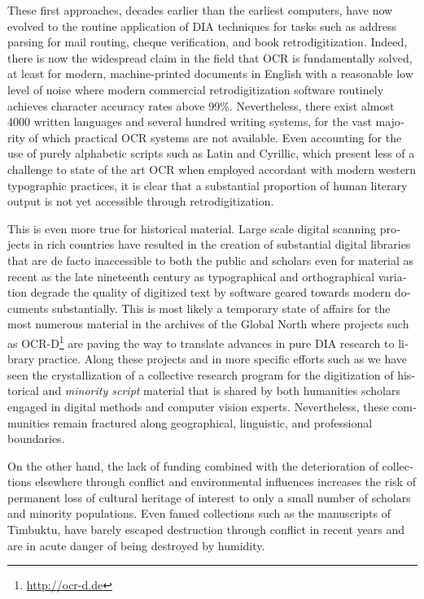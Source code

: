 \begin{french}
These first approaches, decades earlier than the earliest computers, have now
evolved to the routine application of DIA techniques for tasks such as address
parsing for mail routing, cheque verification, and book retrodigitization.
Indeed, there is now the widespread claim in the field that OCR is
fundamentally solved, at least for modern, machine-printed documents in English
with a reasonable low level of noise where modern commercial retrodigitization
software routinely achieves character accuracy rates above 99\%. Nevertheless,
there exist almost 4000 written languages and several hundred writing systems,
for the vast majority of which practical OCR systems are not available. Even
accounting for the use of purely alphabetic scripts such as Latin and Cyrillic,
which present less of a challenge to state of the art OCR when employed
accordant with modern western typographic practices, it is clear that a
substantial proportion of human literary output is not yet accessible through
retrodigitization.

This is even more true for historical material. Large scale digital scanning
projects in rich countries have resulted in the creation of substantial digital
libraries that are de facto inaccessible to both the public and scholars even
for material as recent as the late nineteenth century as typographical and
orthographical variation degrade the quality of digitized text by software
geared towards modern documents substantially. This is most likely a temporary
state of affairs for the most numerous material in the archives of the Global
North where projects such as OCR-D\footnote{\url{http://ocr-d.de}} are paving
the way to translate advances in pure DIA research to library practice. Along
these projects and in more specific efforts such as \cite{smith2018research} we
have seen the crystallization of a collective research program for the
digitization of historical and \emph{minority script} material that is shared
by both humanities scholars engaged in digital methods and computer vision
experts. Nevertheless, these communities remain fractured along geographical,
linguistic, and professional boundaries.

On the other hand, the lack of funding combined with the deterioration of
collections elsewhere through conflict and environmental influences increases
the risk of permanent loss of cultural heritage of interest to only a small
number of scholars and minority populations. Even famed collections such as the
manuscripts of Timbuktu, have barely escaped destruction through conflict in
recent years and are in acute danger of being destroyed by humidity. 


\end{french}
